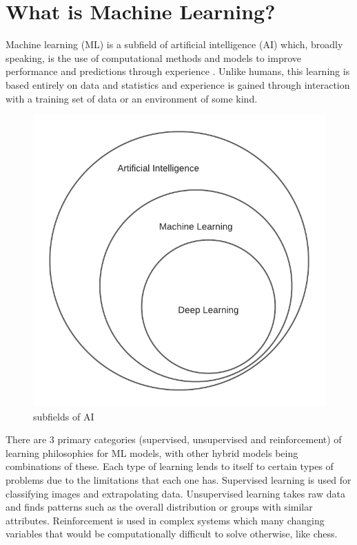 \documentclass[10pt,a4paper]{report}
\begin{document}
		\section{What is Machine Learning?}
			Machine learning (ML) is a subfield of artificial intelligence (AI) which,
			broadly speaking, is the use of computational methods and models to improve
			performance and predictions through experience \autocite[p. 1]{FoundationsOfMachineLearning}.
			Unlike humans, this learning is based entirely on data and statistics and
			experience is gained through interaction with a training set of data
			or an environment of some kind. \par
			\begin{figure}[h]
				\centering
				\includegraphics[scale=0.8]{ai-fields-euler-diagram.png}
				\caption{subfields of AI}
				\label{fig:ai-subfields}
			\end{figure}
			There are 3 primary categories (supervised, unsupervised and reinforcement) of learning philosophies for ML models,
			with other hybrid models being combinations of these. Each type of learning lends to itself to certain types of problems due to
			the limitations that each one has. Supervised learning is used for classifying images and extrapolating data. Unsupervised learning
			takes raw data and finds patterns such as the overall distribution or groups with similar attributes. Reinforcement is used in complex
			systems which many changing variables that would be computationally difficult to solve otherwise, like chess.
\end{document}
